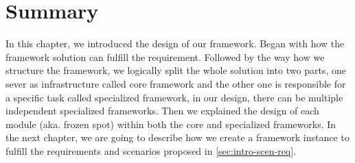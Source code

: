 \section{Summary}
\label{sec:fw-design-summary}

In this chapter, we introduced the design of our framework. Began with how
the framework solution can fulfill the requirement. Followed by the way how we
structure the framework, we logically split the whole solution into two parts,
one sever as infrastructure called core framework and the other one is
responsible for a specific task called specialized framework, in our design,
there can be multiple independent specialized frameworks.
Then we explained the design of each module (aka. frozen spot) within both the
core and specialized frameworks. In the next chapter, we are going to describe
how we create a framework instance to fulfill the requirements and scenarios
proposed in \autoref{sec:intro-scen-req}.


